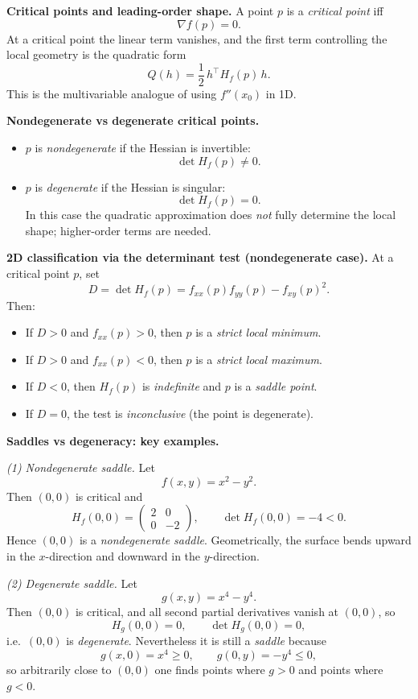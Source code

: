 \documentclass[12pt,a4paper]{article}
\theoremstyle{plain}
\theoremstyle{definition}      %
\begin{document}
	\medskip
	\noindent\textbf{Critical points and leading-order shape.}
	A point $p$ is a \emph{critical point} iff
	\[
	\nabla f(p)=0.
	\]
	At a critical point the linear term vanishes, and the first term controlling the local geometry is the quadratic form
	\[
	Q(h)=\frac12\, h^\top H_f(p)\,h.
	\]
	This is the multivariable analogue of using $f''(x_0)$ in 1D.
	
	\medskip
	\noindent\textbf{Nondegenerate vs degenerate critical points.}
	\begin{itemize}
		\item $p$ is \emph{nondegenerate} if the Hessian is invertible:
		\[
		\det H_f(p)\neq 0.
		\]
		\item $p$ is \emph{degenerate} if the Hessian is singular:
		\[
		\det H_f(p)=0.
		\]
		In this case the quadratic approximation does \emph{not} fully determine the local shape; higher-order terms are needed.
	\end{itemize}
	
	\medskip
	\noindent\textbf{2D classification via the determinant test (nondegenerate case).}
	At a critical point $p$, set
	\[
	D=\det H_f(p)=f_{xx}(p)f_{yy}(p)-f_{xy}(p)^2.
	\]
	Then:
	\begin{itemize}
		\item If $D>0$ and $f_{xx}(p)>0$, then $p$ is a \emph{strict local minimum}.
		\item If $D>0$ and $f_{xx}(p)<0$, then $p$ is a \emph{strict local maximum}.
		\item If $D<0$, then $H_f(p)$ is \emph{indefinite} and $p$ is a \emph{saddle point}.
		\item If $D=0$, the test is \emph{inconclusive} (the point is degenerate).
	\end{itemize}
	
	\bigskip
	\noindent\textbf{Saddles vs degeneracy: key examples.}
	
	\medskip
	\noindent\emph{(1) Nondegenerate saddle.}
	Let
	\[
	f(x,y)=x^2-y^2.
	\]
	Then $(0,0)$ is critical and
	\[
	H_f(0,0)=
	\begin{pmatrix}
		2 & 0\\
		0 & -2
	\end{pmatrix},
	\qquad
	\det H_f(0,0)=-4<0.
	\]
	Hence $(0,0)$ is a \emph{nondegenerate saddle}. Geometrically, the surface bends upward in the $x$-direction and downward in the $y$-direction.
	
	\medskip
	\noindent\emph{(2) Degenerate saddle.}
	Let
	\[
	g(x,y)=x^4-y^4.
	\]
	Then $(0,0)$ is critical, and all second partial derivatives vanish at $(0,0)$, so
	\[
	H_g(0,0)=0,
	\qquad
	\det H_g(0,0)=0,
	\]
	i.e.\ $(0,0)$ is \emph{degenerate}. Nevertheless it is still a \emph{saddle} because
	\[
	g(x,0)=x^4\ge 0,
	\qquad
	g(0,y)=-y^4\le 0,
	\]
	so arbitrarily close to $(0,0)$ one finds points where $g>0$ and points where $g<0$.
	
\end{document}
